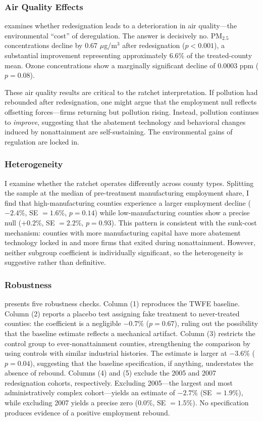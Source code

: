 \documentclass[12pt]{article}
\begin{document}
\subsubsection*{Air Quality Effects}  examines whether redesignation leads to a deterioration in air quality---the environmental ``cost'' of deregulation. The answer is decisively no. PM$_{2.5}$ concentrations decline by 0.67 $\mu$g/m$^3$ after redesignation ($p < 0.001$), a substantial improvement representing approximately 6.6\% of the treated-county mean. Ozone concentrations show a marginally significant decline of 0.0003 ppm ($p = 0.08$).

These air quality results are critical to the ratchet interpretation. If pollution had rebounded after redesignation, one might argue that the employment null reflects offsetting forces---firms returning but pollution rising. Instead, pollution continues to \textit{improve}, suggesting that the abatement technology and behavioral changes induced by nonattainment are self-sustaining. The environmental gains of regulation are locked in.



\subsubsection*{Heterogeneity} I examine whether the ratchet operates differently across county types. Splitting the sample at the median of pre-treatment manufacturing employment share, I find that high-manufacturing counties experience a larger employment decline ($-2.4\%$, SE $= 1.6\%$, $p = 0.14$) while low-manufacturing counties show a precise null ($+0.2\%$, SE $= 2.2\%$, $p = 0.93$). This pattern is consistent with the sunk-cost mechanism: counties with more manufacturing capital have more abatement technology locked in and more firms that exited during nonattainment. However, neither subgroup coefficient is individually significant, so the heterogeneity is suggestive rather than definitive.

\subsubsection*{Robustness}  presents five robustness checks. Column (1) reproduces the TWFE baseline. Column (2) reports a placebo test assigning fake treatment to never-treated counties: the coefficient is a negligible $-0.7\%$ ($p = 0.67$), ruling out the possibility that the baseline estimate reflects a mechanical artifact. Column (3) restricts the control group to ever-nonattainment counties, strengthening the comparison by using controls with similar industrial histories. The estimate is larger at $-3.6\%$ ($p = 0.04$), suggesting that the baseline specification, if anything, understates the absence of rebound. Columns (4) and (5) exclude the 2005 and 2007 redesignation cohorts, respectively. Excluding 2005---the largest and most administratively complex cohort---yields an estimate of $-2.7\%$ (SE $= 1.9\%$), while excluding 2007 yields a precise zero ($0.0\%$, SE $= 1.5\%$). No specification produces evidence of a positive employment rebound.
\end{document}
